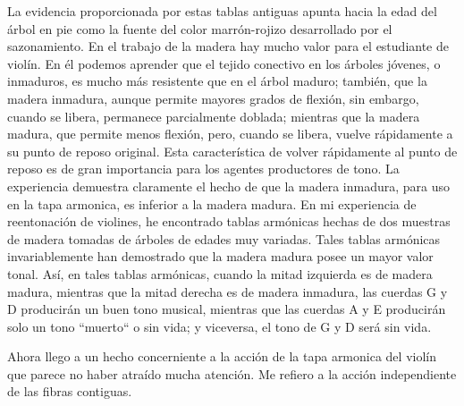 \documentclass[12pt]{book}
\begin{document}
La evidencia proporcionada por estas tablas antiguas apunta hacia la edad del árbol en pie como la fuente del color marrón-rojizo desarrollado por el sazonamiento. En el trabajo de la madera hay mucho valor para el estudiante de violín. En él podemos aprender que el tejido conectivo en los árboles jóvenes, o inmaduros, es mucho más resistente que en el árbol maduro; también, que la madera inmadura, aunque permite mayores grados de flexión, sin embargo, cuando se libera, permanece parcialmente doblada; mientras que la madera madura, que permite menos flexión, pero, cuando se libera, vuelve rápidamente a su punto de reposo original. Esta característica de volver rápidamente al punto de reposo es de gran importancia para los agentes productores de tono. La experiencia demuestra claramente el hecho de que la madera inmadura, para uso en la tapa armonica, es inferior a la madera madura. En mi experiencia de reentonación de violines, he encontrado tablas armónicas hechas de dos muestras de madera tomadas de árboles de edades muy variadas. Tales tablas armónicas invariablemente han demostrado que la madera madura posee un mayor valor tonal. Así, en tales tablas armónicas, cuando la mitad izquierda es de madera madura, mientras que la mitad derecha es de madera inmadura, las cuerdas G y D producirán un buen tono musical, mientras que las cuerdas A y E producirán solo un tono ``muerto`` o sin vida; y viceversa, el tono de G y D será sin vida.

Ahora llego a un hecho concerniente a la acción de la tapa armonica del violín que parece no haber atraído mucha atención. Me refiero a la acción independiente de las fibras contiguas.
\end{document}
